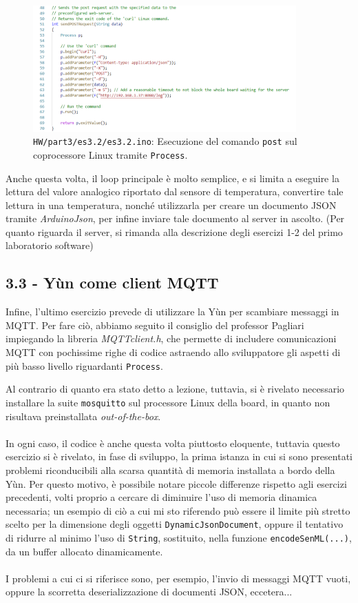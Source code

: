 \documentclass[12pt,a4paper]{article}
\begin{document}
\begin{figure}[h]
    \centering
    \includegraphics[width=0.9\textwidth]{post.png}
    \caption*{\texttt{HW/part3/es3.2/es3.2.ino}: Esecuzione del comando \texttt{post} sul coprocessore Linux tramite \texttt{Process}.}
    \label{fig:post}
\end{figure}

Anche questa volta, il loop principale è molto semplice, e si limita a eseguire la lettura del valore analogico riportato dal sensore di temperatura, convertire tale lettura in una temperatura, nonché utilizzarla per creare un documento JSON tramite \textit{ArduinoJson}, per infine inviare tale documento al server in ascolto. (Per quanto riguarda il server, si rimanda alla descrizione degli esercizi 1-2 del primo laboratorio software)

\subsection{3.3 - Yùn come client MQTT}

Infine, l'ultimo esercizio prevede di utilizzare la Yùn per scambiare messaggi in MQTT. Per fare ciò, abbiamo seguito il consiglio del professor Pagliari impiegando la libreria \textit{MQTTclient.h}, che permette di includere comunicazioni MQTT con pochissime righe di codice astraendo allo sviluppatore gli aspetti di più basso livello riguardanti \verb|Process|.

Al contrario di quanto era stato detto a lezione, tuttavia, si è rivelato necessario installare la suite \verb|mosquitto| sul processore Linux della board, in quanto non risultava preinstallata \textit{out-of-the-box}.
\\ \\
In ogni caso, il codice è anche questa volta piuttosto eloquente, tuttavia questo esercizio si è rivelato, in fase di sviluppo, la prima istanza in cui si sono presentati problemi riconducibili alla scarsa quantità di memoria installata a bordo della Yùn.
Per questo motivo, è possibile notare piccole differenze rispetto agli esercizi precedenti, volti proprio a cercare di diminuire l'uso di memoria dinamica necessaria; un esempio di ciò a cui mi sto riferendo può essere il limite più stretto scelto per la dimensione degli oggetti \verb|DynamicJsonDocument|, oppure il tentativo di ridurre al minimo l'uso di \verb|String|, sostituito, nella funzione \verb|encodeSenML(...)|, da un buffer allocato dinamicamente.
\\ \\
I problemi a cui ci si riferisce sono, per esempio, l'invio di messaggi MQTT vuoti, oppure la scorretta deserializzazione di documenti JSON, eccetera...
\end{document}
